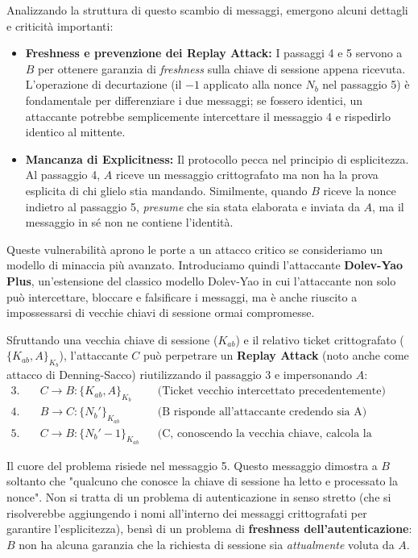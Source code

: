 Analizzando la struttura di questo scambio di messaggi, emergono alcuni dettagli e criticità importanti:
\begin{itemize}
    \item \textbf{Freshness e prevenzione dei Replay Attack:} I passaggi 4 e 5 servono a $B$ per ottenere garanzia di \textit{freshness} sulla chiave di sessione appena ricevuta. L'operazione di decurtazione (il $-1$ applicato alla nonce $N_b$ nel passaggio 5) è fondamentale per differenziare i due messaggi; se fossero identici, un attaccante potrebbe semplicemente intercettare il messaggio 4 e rispedirlo identico al mittente.
    \item \textbf{Mancanza di Explicitness:} Il protocollo pecca nel principio di esplicitezza. Al passaggio 4, $A$ riceve un messaggio crittografato ma non ha la prova esplicita di chi glielo stia mandando. Similmente, quando $B$ riceve la nonce indietro al passaggio 5, \textit{presume} che sia stata elaborata e inviata da $A$, ma il messaggio in sé non ne contiene l'identità.
\end{itemize}

Queste vulnerabilità aprono le porte a un attacco critico se consideriamo un modello di minaccia più avanzato. Introduciamo quindi l'attaccante \textbf{Dolev-Yao Plus}, un'estensione del classico modello Dolev-Yao in cui l'attaccante non solo può intercettare, bloccare e falsificare i messaggi, ma è anche riuscito a impossessarsi di vecchie chiavi di sessione ormai compromesse.

Sfruttando una vecchia chiave di sessione ($K_{ab}$) e il relativo ticket crittografato ($\{K_{ab}, A\}_{K_b}$), l'attaccante $C$ può perpetrare un \textbf{Replay Attack} (noto anche come attacco di Denning-Sacco) riutilizzando il passaggio 3 e impersonando $A$:
\begin{align*}
    3.\quad & C \rightarrow B : \{K_{ab}, A\}_{K_b} && \text{(Ticket vecchio intercettato precedentemente)} \\
    4.\quad & B \rightarrow C : \{N_b'\}_{K_{ab}} && \text{(B risponde all'attaccante credendo sia A)} \\
    5.\quad & C \rightarrow B : \{N_b' - 1\}_{K_{ab}} && \text{(C, conoscendo la vecchia chiave, calcola la risposta)}
\end{align*}

Il cuore del problema risiede nel messaggio 5. Questo messaggio dimostra a $B$ soltanto che "qualcuno che conosce la chiave di sessione ha letto e processato la nonce". Non si tratta di un problema di autenticazione in senso stretto (che si risolverebbe aggiungendo i nomi all'interno dei messaggi crittografati per garantire l'esplicitezza), bensì di un problema di \textbf{freshness dell'autenticazione}: $B$ non ha alcuna garanzia che la richiesta di sessione sia \textit{attualmente} voluta da $A$.

